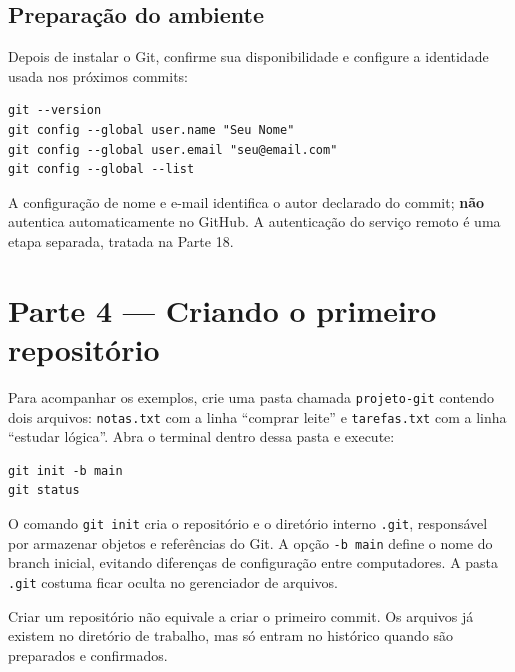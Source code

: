 \documentclass[11pt,a4paper]{article}
\begin{document}
\subsection*{Preparação do ambiente}
Depois de instalar o Git, confirme sua disponibilidade e configure a identidade usada nos próximos commits:
\begin{lstlisting}
git --version
git config --global user.name "Seu Nome"
git config --global user.email "seu@email.com"
git config --global --list
\end{lstlisting}
A configuração de nome e e-mail identifica o autor declarado do commit; \textbf{não} autentica automaticamente no GitHub. A autenticação do serviço remoto é uma etapa separada, tratada na Parte 18.

\section*{Parte 4 --- Criando o primeiro repositório}
Para acompanhar os exemplos, crie uma pasta chamada \texttt{projeto-git} contendo dois arquivos: \texttt{notas.txt} com a linha ``comprar leite'' e \texttt{tarefas.txt} com a linha ``estudar lógica''. Abra o terminal dentro dessa pasta e execute:
\begin{lstlisting}
git init -b main
git status
\end{lstlisting}
O comando \texttt{git init} cria o repositório e o diretório interno \texttt{.git}, responsável por armazenar objetos e referências do Git. A opção \texttt{-b main} define o nome do branch inicial, evitando diferenças de configuração entre computadores. A pasta \texttt{.git} costuma ficar oculta no gerenciador de arquivos.

\begin{tcolorbox}[alertbox,title={UMA DISTINÇÃO IMPORTANTE}]
Criar um repositório não equivale a criar o primeiro commit. Os arquivos já existem no diretório de trabalho, mas só entram no histórico quando são preparados e confirmados.
\end{tcolorbox}
\end{document}
